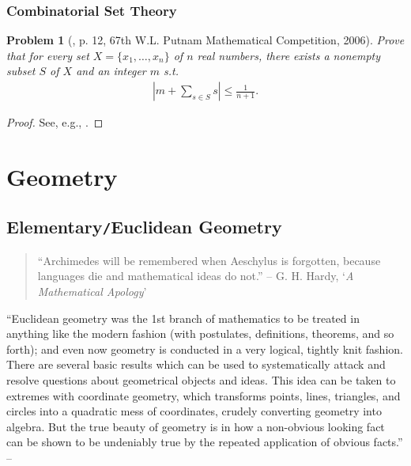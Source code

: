 \documentclass[oneside]{book}
\numberwithin{equation}{section}
\newtheorem{problem}{Problem}[section]
\begin{document}
\section{Combinatorial Set Theory}

\begin{problem}[\cite{Gelca_Andreescu2017}, p. 12, 67th W.L. Putnam Mathematical Competition, 2006]
	Prove that for every set $X = \{x_1,\ldots,x_n\}$ of $n$ real numbers, there exists a nonempty subset $S$ of $X$ and an integer $m$ s.t.
	\begin{align*}
		\left|m + \sum_{s\in S} s\right|\le\frac{1}{n + 1}.
	\end{align*}
\end{problem}

\begin{proof}[Proof]
	See, e.g., \cite[p. 12]{Gelca_Andreescu2017}.
\end{proof}


\part{Geometry}

\chapter{Elementary\texttt{/}Euclidean Geometry}

\begin{quotation}
	``Archimedes will be remembered when Aeschylus is forgotten, because languages die and mathematical ideas do not.'' -- G. H. Hardy, `\textit{A Mathematical Apology}'
\end{quotation}
``Euclidean geometry was the 1st branch of mathematics to be treated in anything like the modern fashion (with postulates, definitions, theorems, and so forth); and even now geometry is conducted in a very logical, tightly knit fashion. There are several basic results which can be used to systematically attack and resolve questions about geometrical objects and ideas. This idea can be taken to extremes with coordinate geometry, which transforms points, lines, triangles, and circles into a quadratic mess of coordinates, crudely converting geometry into algebra. But the true beauty of geometry is in how a non-obvious looking fact can be shown to be undeniably true by the repeated application of obvious facts.'' -- \cite[Chap. 4, p. 49]{Tao2006}
\end{document}
